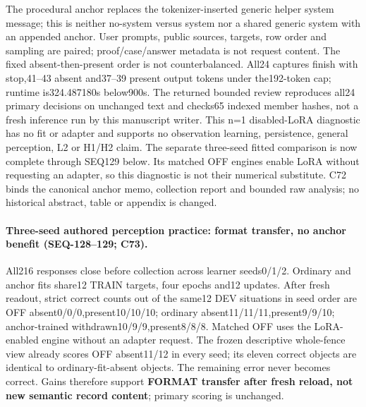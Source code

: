 \documentclass{article}
\begin{document}
The procedural anchor replaces the tokenizer-inserted generic helper system
message; this is neither no-system versus system nor a shared generic system
with an appended anchor. User prompts, public sources, targets, row order and
sampling are paired; proof/case/answer metadata is not request content. The
fixed absent-then-present order is not counterbalanced. All24 captures finish
with stop,41--43 absent and37--39 present output tokens under the192-token cap;
runtime is324.487180s below900s. The returned bounded review reproduces all24
primary decisions on unchanged text and checks65 indexed member hashes, not a
fresh inference run by this manuscript writer. This n=1 disabled-LoRA diagnostic
has no fit or adapter and supports no observation learning, persistence, general
perception, L2 or H1/H2 claim. The separate three-seed fitted comparison is now
complete through SEQ129 below. Its matched OFF engines
enable LoRA without requesting an adapter, so this diagnostic is not their
numerical substitute. C72 binds the canonical anchor memo, collection report
and bounded raw analysis; no historical abstract, table or appendix is changed.

\paragraph{Three-seed authored perception practice: format transfer, no anchor benefit (SEQ-128--129; C73).}
All216 responses close before collection across learner seeds0/1/2. Ordinary
and anchor fits share12 TRAIN targets, four epochs and12 updates. After fresh
readout, strict correct counts out of the same12 DEV situations in seed order
are OFF absent0/0/0,present10/10/10; ordinary absent11/11/11,present9/9/10;
anchor-trained withdrawn10/9/9,present8/8/8. Matched OFF uses the LoRA-enabled
engine without an adapter request. The frozen descriptive whole-fence view
already scores OFF absent11/12 in every seed; its eleven correct objects are
identical to ordinary-fit-absent objects. The remaining error never becomes
correct. Gains therefore support \textbf{FORMAT transfer after fresh reload,
not new semantic record content}; primary scoring is unchanged.
\end{document}
